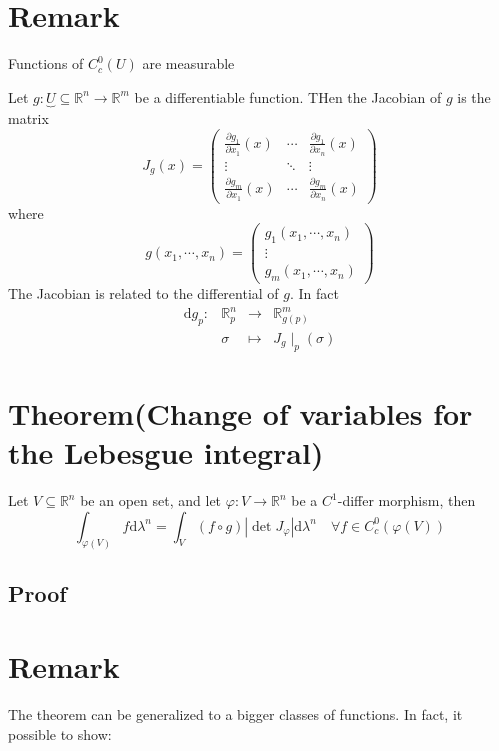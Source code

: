 \documentclass{book}
\newcommand{\abs}[1]{\left\lvert #1 \right\rvert}
\begin{document}
\section{Remark}
Functions of $C^0_c(U)$ are measurable

Let $g:\underbrace U\limits{\subseteq\mathbb{R}^n}\rightarrow\mathbb{R}^m$ be a differentiable function. THen the Jacobian of $g$ is the matrix
$$J_g(x)=\begin{pmatrix}
    \frac{\partial g_1}{\partial x_1}(x)&\cdots&\frac{\partial g_1}{\partial x_n}(x)\\
    \vdots&\ddots&\vdots\\
    \frac{\partial g_m}{\partial x_1}(x)&\cdots&\frac{\partial g_m}{\partial x_n}(x)    
\end{pmatrix}$$
where
$$g(x_1,\cdots,x_n)=\begin{pmatrix}
    g_1(x_1,\cdots,x_n)\\
    \vdots\\
    g_m(x_1,\cdots,x_n)
\end{pmatrix}$$
The Jacobian is related to the differential of $g$. In fact
$$\begin{aligned}
    \text{d}g_p: &\mathbb{R}^n_p &\rightarrow &\mathbb{R}^m_{g(p)}\\
    &\sigma&\mapsto&J_g\mid_p(\sigma)
\end{aligned}$$
\section{Theorem(Change of variables for the Lebesgue integral)}
Let $V\subseteq\mathbb{R}^n$ be an open set, and let $\varphi:V\rightarrow\mathbb{R}^n$ be a $C^1$-differ morphism, then 
$$\int_{\varphi(V)}f\text{d}\lambda^n=\int_V(f\circ g)\abs{\det J_\varphi}\text{d}\lambda^n\quad\forall f\in C^0_c(\varphi(V))$$
\subsection*{Proof}













\section{Remark}
The theorem can be generalized to a bigger classes of functions. In fact, it possible to show:
\end{document}
